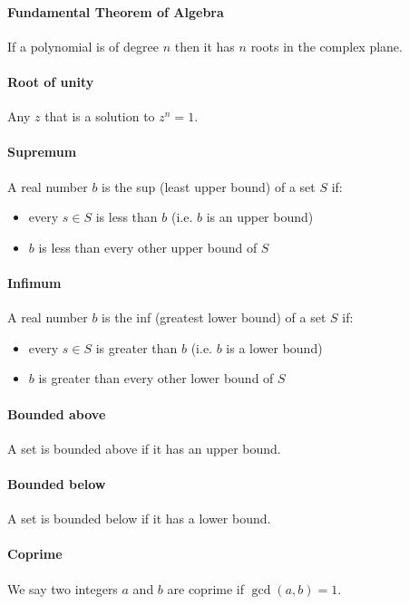 \documentclass{scrartcl}
\begin{document}
\paragraph{Fundamental Theorem of Algebra}
If a polynomial is of degree $ n $ then it has $ n $ roots in the complex plane.

\paragraph{Root of unity}
Any $ z $ that is a solution to $ z^{n} = 1 $.

\paragraph{Supremum}
A real number $ b $ is the sup (least upper bound) of a set $ S $ if:
\begin{itemize}
\item every $ s \in S $ is less than $ b $ (i.e. $ b $ is an upper bound)
\item $ b $ is less than every other upper bound of $ S $
\end{itemize}

\paragraph{Infimum}
A real number $ b $ is the inf (greatest lower bound) of a set $ S $ if:
\begin{itemize}
\item every $ s \in S $ is greater than $ b $ (i.e. $ b $ is a lower bound)
\item $ b $ is greater than every other lower bound of $ S $
\end{itemize}

\paragraph{Bounded above}
A set is bounded above if it has an upper bound.

\paragraph{Bounded below}
A set is bounded below if it has a lower bound.

\paragraph{Coprime}
We say two integers $ a $ and $ b $ are coprime if $ \gcd(a, b) = 1 $.
\end{document}

